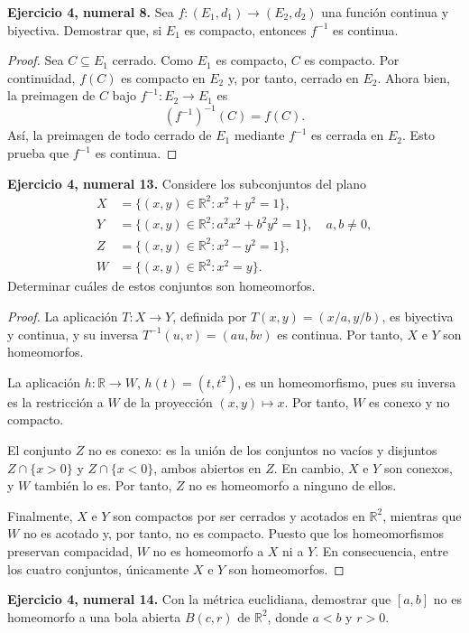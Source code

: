 \documentclass[11pt]{article}
\newcommand{\R}{\mathbb{R}}
\begin{document}
\textbf{Ejercicio 4, numeral 8.} Sea $f:(E_1,d_1)\to(E_2,d_2)$ una función continua y biyectiva. Demostrar que, si $E_1$ es compacto, entonces $f^{-1}$ es continua.

\begin{proof}
Sea $C\subseteq E_1$ cerrado. Como $E_1$ es compacto, $C$ es compacto. Por continuidad, $f(C)$ es compacto en $E_2$ y, por tanto, cerrado en $E_2$. Ahora bien, la preimagen de $C$ bajo $f^{-1}:E_2\to E_1$ es
\[
(f^{-1})^{-1}(C)=f(C).
\]
Así, la preimagen de todo cerrado de $E_1$ mediante $f^{-1}$ es cerrada en $E_2$. Esto prueba que $f^{-1}$ es continua.
\end{proof}

\textbf{Ejercicio 4, numeral 13.} Considere los subconjuntos del plano
\[
\begin{aligned}
X&=\{(x,y)\in\R^2:x^2+y^2=1\},\\
Y&=\{(x,y)\in\R^2:a^2x^2+b^2y^2=1\},\quad a,b\ne0,\\
Z&=\{(x,y)\in\R^2:x^2-y^2=1\},\\
W&=\{(x,y)\in\R^2:x^2=y\}.
\end{aligned}
\]
Determinar cuáles de estos conjuntos son homeomorfos.

\begin{proof}
La aplicación $T:X\to Y$, definida por $T(x,y)=(x/a,y/b)$, es biyectiva y continua, y su inversa $T^{-1}(u,v)=(au,bv)$ es continua. Por tanto, $X$ e $Y$ son homeomorfos.

La aplicación $h:\R\to W$, $h(t)=(t,t^2)$, es un homeomorfismo, pues su inversa es la restricción a $W$ de la proyección $(x,y)\mapsto x$. Por tanto, $W$ es conexo y no compacto.

El conjunto $Z$ no es conexo: es la unión de los conjuntos no vacíos y disjuntos $Z\cap\{x>0\}$ y $Z\cap\{x<0\}$, ambos abiertos en $Z$. En cambio, $X$ e $Y$ son conexos, y $W$ también lo es. Por tanto, $Z$ no es homeomorfo a ninguno de ellos.

Finalmente, $X$ e $Y$ son compactos por ser cerrados y acotados en $\R^2$, mientras que $W$ no es acotado y, por tanto, no es compacto. Puesto que los homeomorfismos preservan compacidad, $W$ no es homeomorfo a $X$ ni a $Y$. En consecuencia, entre los cuatro conjuntos, únicamente $X$ e $Y$ son homeomorfos.
\end{proof}

\textbf{Ejercicio 4, numeral 14.} Con la métrica euclidiana, demostrar que $[a,b]$ no es homeomorfo a una bola abierta $B(c,r)$ de $\R^2$, donde $a<b$ y $r>0$.
\end{document}
